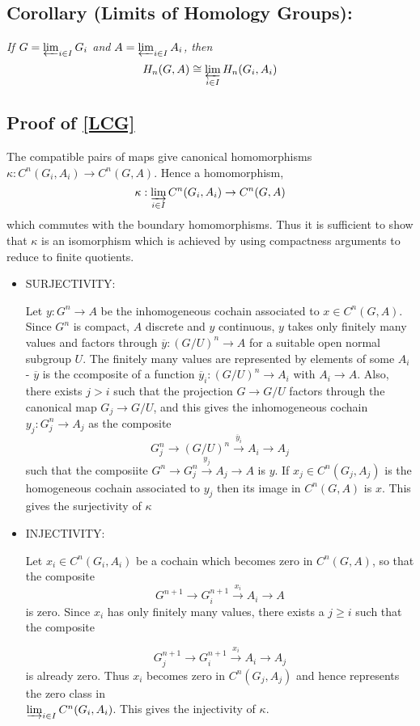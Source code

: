 \subsection{Corollary (Limits of Homology Groups): \label{LHG}}
\emph{If $G = \varprojlim_{i\in I} G_i$ and $A = \varprojlim_{i\in I} A_i$, then
$$H_n(G,A) \cong \varprojlim_{i\in I} H_n(G_i, A_i)$$}


\subsection*{Proof of \ref{LCG}}
The compatible pairs of maps give canonical homomorphisms $\kappa: C^n(G_i, A_i) \rightarrow C^n(G,A)$. Hence a homomorphism,
$$\kappa: \varinjlim_{i\in I} C^n(G_i, A_i) \rightarrow C^n(G,A)$$ which commutes with the boundary homomorphisms. Thus it is sufficient to show that $\kappa$ is an isomorphism which is achieved by using compactness arguments to reduce to finite quotients.

\begin{itemize}
\item SURJECTIVITY:

Let $y:G^n\rightarrow A$ be the inhomogeneous cochain associated to $x\in C^n(G,A)$. Since $G^n$ is compact, $A$ discrete and $y$ continuous, $y$ takes only finitely many values and factors through $\overline y : (G/U)^n\rightarrow A$ for a suitable open normal subgroup $U$. The finitely many values are represented by elements of some $A_i$ - $\overline y$ is the ccomposite of a function $\overline y_i: (G/U)^n\rightarrow A_i$ with $A_i\rightarrow A$. Also, there exists $j>i$ such that the projection $G\rightarrow G/U$ factors through the canonical map $G_j\rightarrow G/U$, and this gives the inhomogeneous cochain $y_j:G^n_j \rightarrow A_j$ as the composite
$$G_j^n \rightarrow (G/U)^n\xrightarrow{\overline y_i} A_i\rightarrow A_j$$
such that the composiite $G^n \rightarrow G^n_j \xrightarrow{y_j} A_j\rightarrow A$ is $y$. If $x_j\in C^n(G_j,A_j)$ is the homogeneous cochain associated to $y_j$ then its image in $C^n(G,A)$ is $x$. This gives the surjectivity of $\kappa$ 
\item INJECTIVITY:

Let $x_i\in C^n(G_i, A_i)$ be a cochain which becomes zero in $C^n(G,A)$, so that the composite
$$G^{n+1}\rightarrow G_i^{n+1}\xrightarrow{x_i}A_i\rightarrow A$$ is zero. Since $x_i$ has only finitely many values, there exists a $j\geq i$ such that the composite

$$G_j^{n+1}\rightarrow G_i^{n+1}\xrightarrow{x_i}A_i\rightarrow A_j$$ is already zero. Thus $x_i$ becomes zero in $C^n(G_j,A_j)$ and hence represents the zero class in \\ $\varinjlim_{i\in I} C^n(G_i,A_i)$. This gives the injectivity of $\kappa$.

\end{itemize}


